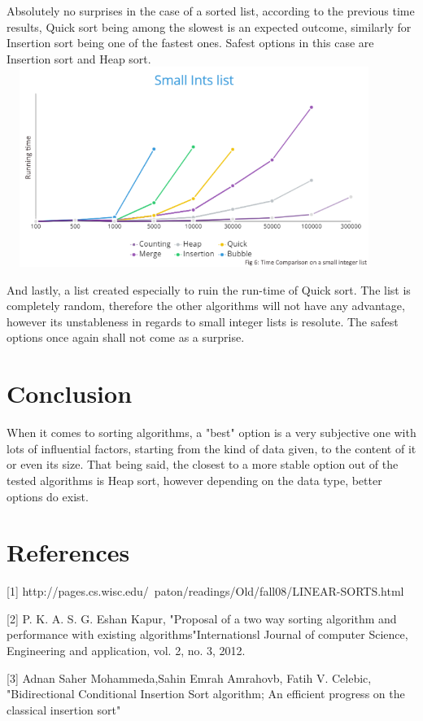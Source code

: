\documentclass{article}
\begin{document}
\begin{center}
Absolutely no surprises in the case of a sorted list, according to the previous time results, Quick sort being among the slowest is an expected outcome, similarly for Insertion sort being one of the fastest ones. Safest options in this case are Insertion sort and Heap sort.
\smallbreak
\includegraphics[width=12.2cm, height=6.5cm]{Pics/Small Ints list.png}

And lastly, a list created especially to ruin the run-time of Quick sort. The list is completely random, therefore the other algorithms will not have any advantage, however its unstableness in regards to small integer lists is resolute. The safest options once again shall not come as a surprise.
\end{center}

\clearpage
\section{Conclusion}
When it comes to sorting algorithms, a "best" option is a very subjective one with lots of influential factors, starting from the kind of data given, to the content of it or even its size. That being said, the closest to a more stable option out of the tested algorithms is Heap sort, however depending on the data type, better options do exist.

\section{References}
[1] http://pages.cs.wisc.edu/~paton/readings/Old/fall08/LINEAR-SORTS.html


[2] P. K. A. S. G. Eshan Kapur, "Proposal of a two way sorting algorithm and performance with existing algorithms"Internationsl Journal of computer Science, Engineering and application, vol. 2, no. 3, 2012.


[3] Adnan Saher Mohammeda,Sahin Emrah Amrahovb, Fatih V. Celebic, "Bidirectional Conditional Insertion Sort algorithm; An efficient progress on the classical insertion sort"
\end{document}
